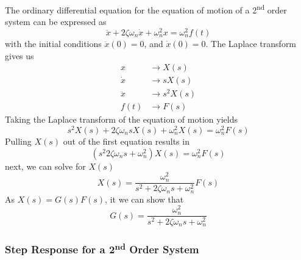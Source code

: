 \documentclass[12pt,letter]{article}
\begin{document}
The ordinary differential equation for the equation of motion of a 2\textsuperscript{nd} order system can be expressed as
\begin{equation}
\ddot{x} + 2 \zeta \omega_n \dot{x} + \omega_n^2 x = \omega_n^2 f(t)
\end{equation}
with the initial conditions $\ddot{x}(0) = 0$, and $\dot{x}(0) = 0$. The Laplace transform gives us
\begin{align}
x & \rightarrow X(s) \\
\dot{x} & \rightarrow sX(s) \nonumber \\
\ddot{x} & \rightarrow s^2X(s) \nonumber \\
f(t) & \rightarrow F(s) \nonumber 
\end{align}
Taking the Laplace transform of the equation of motion yields
\begin{equation}
s^2X(s) + 2 \zeta \omega_n s X(s) + \omega_n^2 X(s) = \omega_n^2 F(s)
\end{equation}
Pulling $X(s)$ out of the first equation results in
\begin{equation}
(s^2 2 \zeta \omega_n s + \omega_n^2)X(s) = \omega_n^2 F(s)
\end{equation}
next, we can solve for $X(s)$
\begin{equation}
X(s) = \frac{\omega_n^2}{s^2 + 2 \zeta \omega_n s + \omega_n^2}F(s)
\end{equation}
As $X(s) = G(s)F(s)$, it we can show that
\begin{equation}
G(s) = \frac{\omega_n^2}{s^2 + 2 \zeta \omega_n s + \omega_n^2}
\end{equation}



\subsubsection{Step Response for a 2\textsuperscript{nd} Order System }
\end{document}
